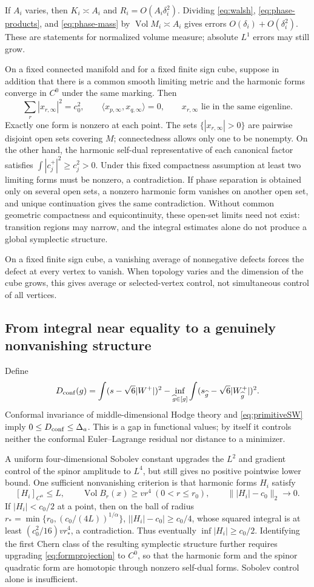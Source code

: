 \documentclass[a4paper,11pt]{article}
\numberwithin{equation}{section}
\theoremstyle{definition}
\newcommand{\Vol}{\operatorname{Vol}}
\begin{document}
If $A_i$ varies, then $K_i\asymp A_i$ and $R_i=O(A_i\delta_i^2)$.
Dividing \eqref{eq:walsh}, \eqref{eq:phase-products}, and \eqref{eq:phase-mass}
by $\Vol M_i\asymp A_i$ gives errors $O(\delta_i)+O(\delta_i^2)$.
These are statements for normalized volume measure; absolute $L^1$ errors may still grow.

On a fixed connected manifold and for a fixed finite sign cube, suppose in addition that there is a common smooth limiting metric
and the harmonic forms converge in $C^0$ under the same marking. Then
\[
\sum_r|x_{r,\infty}|^2=c_0^2,\qquad
\langle x_{p,\infty},x_{q,\infty}\rangle=0,
\qquad x_{r,\infty}\text{ lie in the same eigenline}.
\]
Exactly one form is nonzero at each point. The sets
$\{|x_{r,\infty}|>0\}$ are pairwise disjoint open sets covering $M$; connectedness allows only one to be nonempty.
On the other hand, the harmonic self-dual representative of each canonical factor satisfies
$\int|c_j^+|^2\ge c_j^2>0$. Under this fixed compactness assumption at least two limiting forms must be nonzero, a contradiction.
If phase separation is obtained only on several open sets, a nonzero harmonic form vanishes on another open set,
and unique continuation gives the same contradiction.
Without common geometric compactness and equicontinuity, these open-set limits need not exist:
transition regions may narrow, and the integral estimates alone do not produce a global symplectic structure.

On a fixed finite sign cube, a vanishing average of nonnegative defects forces the defect at every vertex to vanish.
When topology varies and the dimension of the cube grows, this gives average or selected-vertex control, not simultaneous control of all vertices.

\subsection{From integral near equality to a genuinely nonvanishing structure}
Define
\[
D_{\rm conf}(g)=\int(s-\sqrt6|W^+|)^2
-\inf_{\widehat g\in[g]}\int(s_{\widehat g}-\sqrt6|W^+_{\widehat g}|)^2.
\]
Conformal invariance of middle-dimensional Hodge theory and \eqref{eq:primitiveSW} imply
$0\le D_{\rm conf}\le\Delta_a$. This is a gap in functional values; by itself it controls neither the conformal Euler--Lagrange residual nor distance to a minimizer.

A uniform four-dimensional Sobolev constant upgrades the $L^2$ and gradient control of the spinor amplitude to $L^4$, but still gives no positive pointwise lower bound.
One sufficient nonvanishing criterion is that harmonic forms $H_i$ satisfy
\[
[H_i]_{C^\alpha}\le L,\qquad
\Vol B_r(x)\ge vr^4\ (0<r\le r_0),\qquad
\||H_i|-c_0\|_2\to0.
\]
If $|H_i|<c_0/2$ at a point, then on the ball of radius
$r_*=\min\{r_0,(c_0/(4L))^{1/\alpha}\}$,
$\bigl||H_i|-c_0\bigr|\ge c_0/4$,
whose squared integral is at least $(c_0^2/16)vr_*^4$, a contradiction.
Thus eventually $\inf|H_i|\ge c_0/2$.
Identifying the first Chern class of the resulting symplectic structure further requires upgrading \eqref{eq:formprojection} to $C^0$, so that the harmonic form and the spinor quadratic form are homotopic through nonzero self-dual forms. Sobolev control alone is insufficient.
\end{document}
